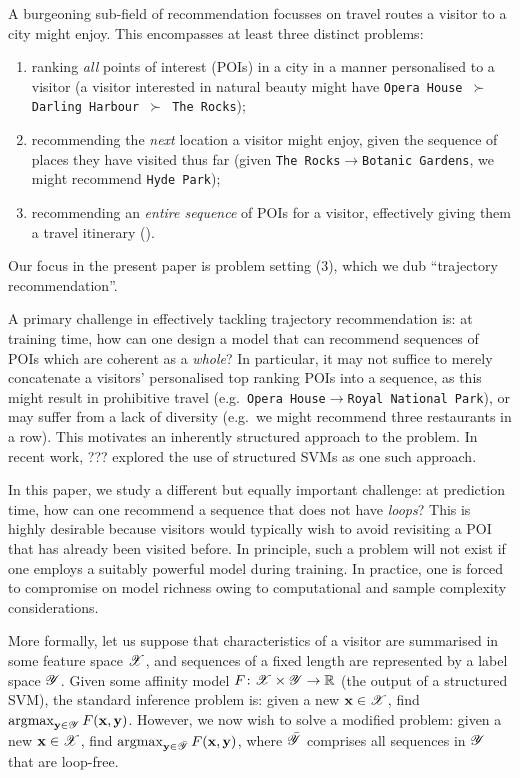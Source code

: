 
A burgeoning sub-field of recommendation focusses on travel routes a visitor to a city might enjoy.
This encompasses at least three distinct problems:
\begin{enumerate}[(1)]
	\item ranking \emph{all} points of interest (POIs) in a city in a manner personalised to a visitor (\eg a visitor interested in natural beauty might have {\tt Opera House $\succ$ Darling Harbour $\succ$ The Rocks});
	\item recommending the \emph{next} location a visitor might enjoy, given the sequence of places they have visited thus far (\eg given {\tt The Rocks$\to$Botanic Gardens}, we might recommend {\tt Hyde Park});
	\item recommending an \emph{entire sequence} of POIs for a visitor, effectively giving them a travel itinerary ().
\end{enumerate}
Our focus in the present paper is problem setting (3), which we dub ``trajectory recommendation''.

A primary challenge in effectively tackling trajectory recommendation is:
at training time, how can one design a model that can recommend sequences of POIs which are coherent as a \emph{whole}?
In particular, it may not suffice to merely concatenate a visitors' personalised top ranking POIs into a sequence,
as this might result in prohibitive travel (e.g.\ {\tt Opera House$\to$Royal National Park}),
or may suffer from a lack of diversity (e.g.\ we might recommend three restaurants in a row).
This motivates an inherently structured approach to the problem.
In recent work, ??? explored the use of structured SVMs as one such approach.

In this paper, we study a different but equally important challenge:
at prediction time, how can one recommend a sequence that does not have \emph{loops}?
This is highly desirable because visitors would typically wish to avoid revisiting a POI that has already been visited before.
In principle, such a problem will not exist if one employs a suitably powerful model during training.
In practice, one is forced to compromise on model richness owing to computational and sample complexity considerations.

More formally, let us suppose that characteristics of a visitor are summarised in some feature space $\mathscr{X}$,
and sequences of a fixed length are represented by a label space $\mathscr{Y}$.
Given some affinity model $F \colon \mathscr{X} \times \mathscr{Y} \to \mathbb{R}$ (\eg the output of a structured SVM), the standard inference problem is:
given a new $\mathbf{x} \in \mathscr{X}$, find $\operatorname*{argmax}_{\mathbf{y} \in \mathscr{Y}} F( \mathbf{x}, \mathbf{y} )$.
However, we now wish to solve a modified problem:
given a new $\mathbf{x} \in \mathscr{X}$, find $\operatorname*{argmax}_{\mathbf{y} \in \bar{\mathscr{Y}}} F( \mathbf{x}, \mathbf{y} )$,
where $\bar{\mathscr{Y}}$ comprises all sequences in $\mathscr{Y}$ that are loop-free.


